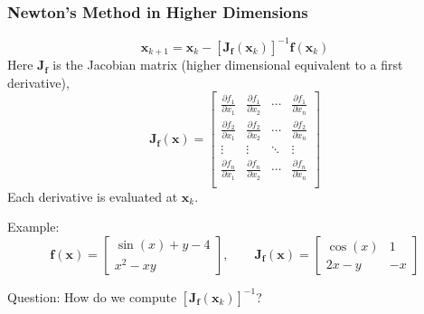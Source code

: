 \documentclass[10pt]{beamer}
\begin{document}
\begin{frame}
\frametitle{Newton's Method in Higher Dimensions}
\[
\mathbf{x}_{k+1} = \mathbf{x}_{k} - [\mathbf{J}_{\mathbf{f}}(\mathbf{x}_k)]^{-1} \mathbf{f}(\mathbf{x}_k)
\]
   Here $\mathbf{J}_{\mathbf{f}}$ is the Jacobian matrix (higher dimensional equivalent to a first derivative),
\[
\mathbf{J}_{\mathbf{f}}(\mathbf{x}) = \begin{bmatrix}
\frac{\partial f_1}{\partial x_1} &  \frac{\partial f_1}{\partial x_2} &  \cdots  & \frac{\partial f_1}{\partial x_n} \\
\frac{\partial f_2}{\partial x_1} &  \frac{\partial f_2}{\partial x_2} &  \cdots  & \frac{\partial f_2}{\partial x_n} \\
\vdots & \vdots& \ddots& \vdots\\
\frac{\partial f_n}{\partial x_1} &  \frac{\partial f_n}{\partial x_2} &  \cdots  & \frac{\partial f_n}{\partial x_n} \\
\end{bmatrix}
\]
Each derivative is evaluated at $\mathbf{x}_k$. \\
\vspace{3ex}

Example:
\[
\mathbf{f}(\mathbf{x}) = \begin{bmatrix}
\sin(x) + y  - 4\\
x^2 - xy
\end{bmatrix}, \qquad 
\mathbf{J}_{\mathbf{f}}(\mathbf{x}) = \begin{bmatrix}
\cos(x) & 1 \\
2x - y & -x
\end{bmatrix}
\]

Question: How do we compute  $[\mathbf{J}_{\mathbf{f}}(\mathbf{x}_k)]^{-1}$?

\end{frame}
\end{document}
